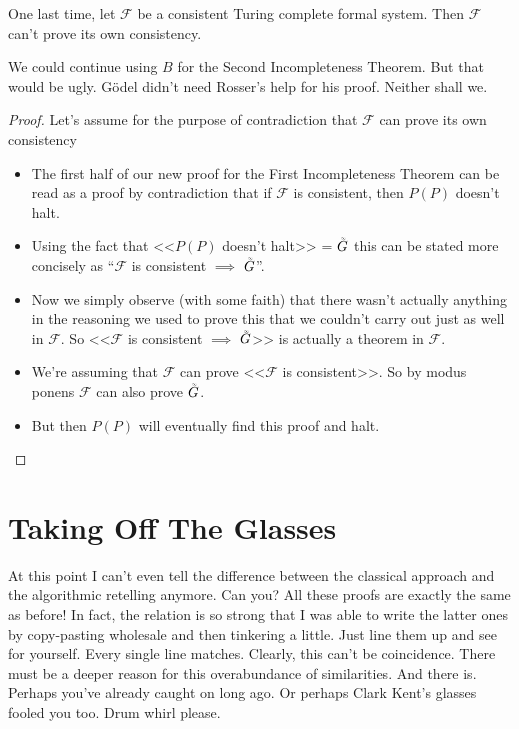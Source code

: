 \documentclass{article}
\theoremstyle{customstyle}
\newcommand{\F}{\ensuremath{\mathcal{F}}}
\newcommand{\iGoedel}{\ensuremath{\accentset{\scalebox{0.35}{$\infty$}}{G}}}
\begin{document}
\begin{theorem}
One last time, let $\F$ be a consistent Turing complete formal system. Then $\F$ can't prove its own consistency.
\end{theorem}

We could continue using $B$ for the Second Incompleteness Theorem. But that would be ugly. Gödel didn't need Rosser's help for his proof. Neither shall we.

\begin{proof}
Let's assume for the purpose of contradiction that $\F$ can prove its own consistency
\begin{itemize}[topsep=0.5em]
\item The first half of our new proof for the First Incompleteness Theorem can be read as a proof by contradiction that if $\F$ is consistent, then $P(P)$ doesn't halt.
\item Using the fact that <<$P(P)$ doesn't halt>> = $\iGoedel$ this can be stated more concisely as ``$\F$ is consistent $\implies$ $\iGoedel$''.
\item Now we simply observe (with some faith) that there wasn't actually anything in the reasoning we used to prove this that we couldn't carry out just as well in $\F$. So <<$\F$ is consistent $\implies$ $\iGoedel$>> is actually a theorem in $\F$.
\item We're assuming that $\F$ can prove <<$\F$ is consistent>>. So by modus ponens $\F$ can also prove $\iGoedel$.
\item But then $P(P)$ will eventually find this proof and halt. \lightning\qedhere
\end{itemize}
\end{proof}

\section{Taking Off The Glasses}

At this point I can't even tell the difference between the classical approach and the algorithmic retelling anymore. Can you? All these proofs are exactly the same as before! In fact, the relation is so strong that I was able to write the latter ones by copy-pasting wholesale and then tinkering a little. Just line them up and see for yourself. Every single line matches. Clearly, this can't be coincidence. There must be a deeper reason for this overabundance of similarities. And there is. Perhaps you've already caught on long ago. Or perhaps Clark Kent's glasses fooled you too. Drum whirl please.
\end{document}
